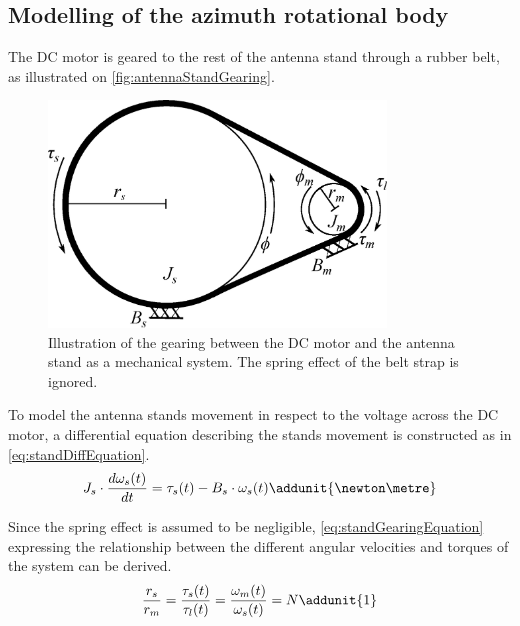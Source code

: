 \subsection{Modelling of the azimuth rotational body}\label{sec:standAzimuthModel}
The DC motor is geared to the rest of the antenna stand through a rubber belt, as illustrated on \autoref{fig:antennaStandGearing}.
\begin{figure}[h!]
	\centering
	\includegraphics[width=0.80\textwidth]{figures/technical/antennaStandGearing}
	\caption{Illustration of the gearing between the DC motor and the antenna stand as a mechanical system. The spring effect of the belt strap is ignored.}
	\label{fig:antennaStandGearing}
\end{figure}

To model the antenna stands movement in respect to the voltage across the DC motor, a differential equation describing the stands movement is constructed as in \autoref{eq:standDiffEquation}.
\begin{equation} \label{eq:standDiffEquation}
J_s \cdot \frac{d \omega_{s}(t)}{d t} = \tau_{s}(t) - B_s \cdot \omega_{s}(t) \addunit{\newton\metre}
\end{equation}
\startexplain
{}
\stopexplain

Since the spring effect is assumed to be negligible, \autoref{eq:standGearingEquation} expressing the relationship between the different angular velocities and torques of the system can be derived.
\begin{equation} \label{eq:standGearingEquation}
\frac{r_s}{r_m}=\frac{\tau_s(t)}{\tau_l(t)} = \frac{\omega_m(t)}{\omega_s(t)} = N \addunit{1}
\end{equation}
\startexplain
{}
\stopexplain

